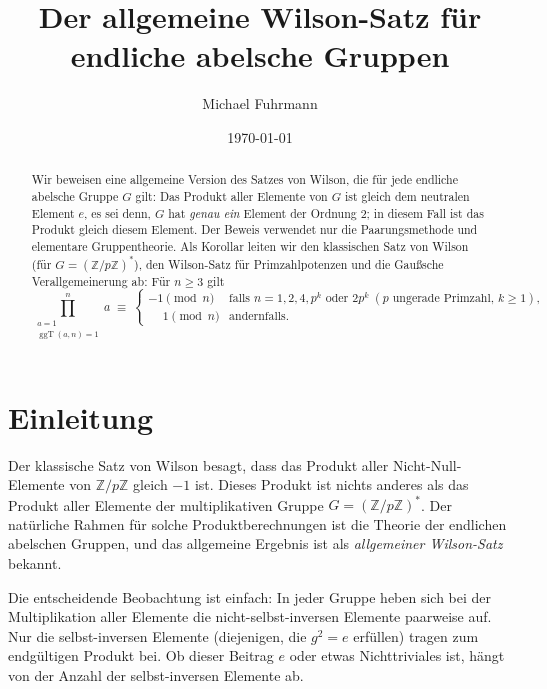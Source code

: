 \documentclass[12pt,a4paper]{amsart}
\theoremstyle{definition}
\newcommand{\Z}{\mathbb{Z}}
\DeclareMathOperator{\ggT}{ggT}
\begin{document}

\title{Der allgemeine Wilson-Satz für endliche abelsche Gruppen}

\author{Michael Fuhrmann}
\address{Specialist-Mathematics-Projekt, Build 65}
\date{\today}

\begin{abstract}
Wir beweisen eine allgemeine Version des Satzes von Wilson, die für jede
endliche abelsche Gruppe $G$ gilt: Das Produkt aller Elemente von $G$ ist
gleich dem neutralen Element $e$, es sei denn, $G$ hat \emph{genau ein}
Element der Ordnung $2$; in diesem Fall ist das Produkt gleich diesem Element.
Der Beweis verwendet nur die Paarungsmethode und elementare Gruppentheorie.
Als Korollar leiten wir den klassischen Satz von Wilson (für $G = (\Z/p\Z)^*$),
den Wilson-Satz für Primzahlpotenzen und die Gaußsche Verallgemeinerung ab:
Für $n \geq 3$ gilt
\[
  \prod_{\substack{a=1\\\ggT(a,n)=1}}^{n} a
  \;\equiv\;
  \begin{cases}
    -1 \pmod{n} & \text{falls } n = 1, 2, 4, p^k \text{ oder } 2p^k
                  \;(p \text{ ungerade Primzahl, } k \geq 1),\\
    \phantom{-}1 \pmod{n} & \text{andernfalls.}
  \end{cases}
\]
\end{abstract}

\maketitle
\tableofcontents

\section{Einleitung}

Der klassische Satz von Wilson besagt, dass das Produkt aller Nicht-Null-Elemente
von $\Z/p\Z$ gleich $-1$ ist. Dieses Produkt ist nichts anderes als das Produkt
aller Elemente der multiplikativen Gruppe $G = (\Z/p\Z)^*$.
Der natürliche Rahmen für solche Produktberechnungen ist die Theorie der endlichen
abelschen Gruppen, und das allgemeine Ergebnis ist als \emph{allgemeiner Wilson-Satz}
bekannt.

Die entscheidende Beobachtung ist einfach: In jeder Gruppe heben sich bei der
Multiplikation aller Elemente die nicht-selbst-inversen Elemente paarweise auf.
Nur die selbst-inversen Elemente (diejenigen, die $g^2 = e$ erfüllen) tragen
zum endgültigen Produkt bei. Ob dieser Beitrag $e$ oder etwas Nichttriviales ist,
hängt von der Anzahl der selbst-inversen Elemente ab.
\end{document}
